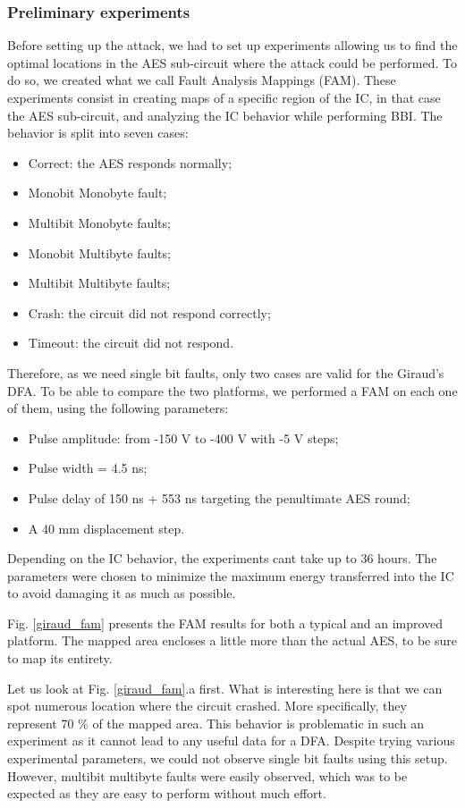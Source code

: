 		\subsubsection{Preliminary experiments}
			Before setting up the attack, we had to set up experiments allowing us to find the optimal locations in the AES sub-circuit where the attack could be performed.
			To do so, we created what we call Fault Analysis Mappings (FAM).
			These experiments consist in creating maps of a specific region of the IC, in that case the AES sub-circuit, and analyzing the IC behavior while performing BBI.
			The behavior is split into seven cases:
			\begin{itemize}
				\item Correct: the AES responds normally;
				\item Monobit Monobyte fault;
				\item Multibit Monobyte faults;
				\item Monobit Multibyte faults;
				\item Multibit Multibyte faults;
				\item Crash: the circuit did not respond correctly;
				\item Timeout: the circuit did not respond.
			\end{itemize}
			Therefore, as we need single bit faults, only two cases are valid for the Giraud's DFA.
			To be able to compare the two platforms, we performed a FAM on each one of them, using the following parameters:
			\begin{itemize}
				\item Pulse amplitude: from -150 V to -400 V with -5 V steps;
				\item Pulse width = 4.5 ns;
				\item Pulse delay of 150 ns + 553 ns targeting the penultimate AES round;
				\item A 40 mm displacement step.
			\end{itemize}
			Depending on the IC behavior, the experiments cant take up to 36 hours.
			The parameters were chosen to minimize the maximum energy transferred into the IC to avoid damaging it as much as possible.
			
			Fig. \ref{giraud_fam} presents the FAM results for both a typical and an improved platform.
			The mapped area encloses a little more than the actual AES, to be sure to map its entirety.
			
			Let us look at Fig. \ref{giraud_fam}.a first.
			What is interesting here is that we can spot numerous location where the circuit crashed.
			More specifically, they represent 70 \% of the mapped area.
			This behavior is problematic in such an experiment as it cannot lead to any useful data for a DFA.
			Despite trying various experimental parameters, we could not observe single bit faults using this setup.
			However, multibit multibyte faults were easily observed, which was to be expected as they are easy to perform without much effort.
			
